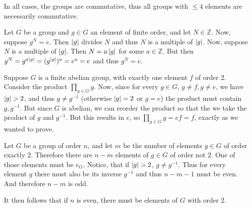\begin{solution}
	In all cases, the groups are commutative, thus all groups with $\leq 4$ elements are necessarily commutative.
\end{solution}

\begin{problem}
\end{problem}

\begin{solution}
	Let $G$ be a group and $g \in G$ an element of finite order, and let $N \in \mathbb{Z}$. Now, suppose $g^N = e$. Then $\left|g\right|$ divides $N$ and thus $N$ is a multiple of $\left|g\right|$. Now, suppose $N$ is a multiple of $\left|g\right|$. Then $N = a\left|g\right|$ for some $a \in \mathbb{Z}$. But then $g^N = g^{a\left|g\right|}=(g^{\left|g\right|})^a=e^a=e$ and thus $g^N = e$.
\end{solution}

\begin{problem}
\end{problem}

\begin{solution}
	Suppose $G$ is a finite abelian group, with exactly one element $f$ of order 2. Consider the product $\prod_{g \in G} g$. Now, since for every $g \in G$, $g \neq f, g \neq e$, we have $\left|g\right| > 2$, and thus $g \neq g^{-1}$ (otherwise $\left|g\right| = 2$ or $g = e$) the product must contain $g, g^{-1}$. But since $G$ is abelian, we can reorder the product so that the we take the product of $g$ and $g^{-1}$. But this results in $e$, so $\prod_{g \in G} g = ef = f$, exactly as we wanted to prove.
\end{solution}

\begin{problem}
\end{problem}

\begin{solution}
	Let $G$ be a group of order $n$, and let $m$ be the number of elements $g \in G$ of order exactly $2$. Therefore there are $n - m$ elements of $g \in G$ of order not $2$. One of those elements must be $e_G$. Notice, that if $\left|g\right| > 2$, $g \neq g^{-1}$. Thus for every element $g$ there must also be its inverse $g^{-1}$ and thus $n - m - 1$ must be even. And therefore $n - m$ is odd.
	
	It then follows that if $n$ is even, there must be elements of $G$ with order $2$. 
\end{solution}

\begin{problem}
\end{problem}

